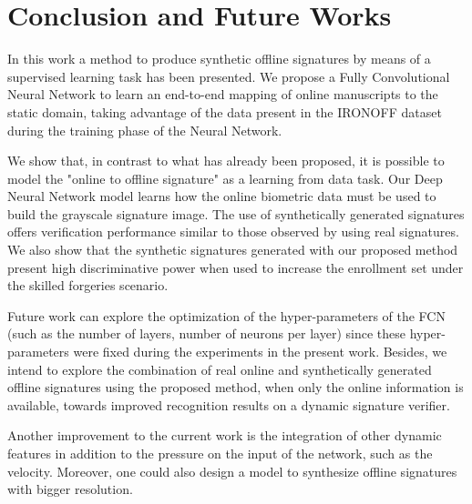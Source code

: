 
\chapter{Conclusion and Future Works}\label{ch:conclusion}

In this work a method to produce synthetic offline signatures by means of a supervised learning task has been presented. We propose a Fully Convolutional Neural Network to learn an end-to-end mapping of online manuscripts to the static domain, taking advantage of the data present in the IRONOFF dataset during the training phase of the Neural Network. 

We show that, in contrast to what has already been proposed, it is possible to model the "online to offline signature" as a learning from data task. Our Deep Neural Network model learns how the online biometric data must be used to build the grayscale signature image.  The use of synthetically generated signatures offers verification performance similar to those observed by using real signatures. We also show that the synthetic signatures generated with our proposed method present high discriminative power when used to increase the enrollment set under the skilled forgeries scenario. 

Future work can explore the optimization of the hyper-parameters of the FCN (such as the number of layers, number of neurons per layer) since these hyper-parameters were fixed during the experiments in the present work. Besides, we intend to explore the combination of real online and synthetically generated offline signatures using the proposed method, when only the online information is available, towards improved recognition results on a dynamic signature verifier.

Another improvement to the current work is the integration of other dynamic features in addition to the pressure on the input of the network, such as the velocity. Moreover, one could also design a model to synthesize offline signatures with bigger resolution.